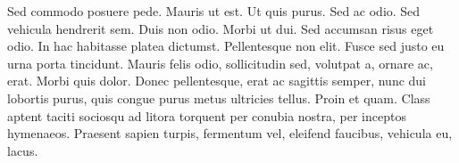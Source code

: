 Sed commodo posuere pede. Mauris ut est. Ut quis purus. Sed ac odio. Sed vehicula hendrerit sem. Duis non odio. Morbi ut dui. Sed accumsan risus eget odio. In hac habitasse platea dictumst. Pellentesque non elit. Fusce sed justo eu urna porta tincidunt. Mauris felis odio, sollicitudin sed, volutpat a, ornare ac, erat. Morbi quis dolor. Donec pellentesque, erat ac sagittis semper, nunc dui lobortis purus, quis congue purus metus ultricies tellus. Proin et quam. Class aptent taciti sociosqu ad litora torquent per conubia nostra, per inceptos hymenaeos. Praesent sapien turpis, fermentum vel, eleifend faucibus, vehicula eu, lacus. \cite{lorem1500}